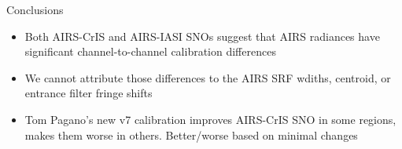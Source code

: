 \documentclass[10pt,t]{beamer}
\begin{document}
\begin{frame}[label={sec:orgee82d00}]{Conclusions}
\begin{itemize}
\item Both AIRS-CrIS and AIRS-IASI SNOs suggest that AIRS radiances have significant channel-to-channel calibration differences
\item We cannot attribute those differences to the AIRS SRF wdiths, centroid, or entrance filter fringe shifts
\item Tom Pagano's new v7 calibration improves AIRS-CrIS SNO in some regions, makes them worse in others.  Better/worse based on minimal changes
\end{itemize}
\end{frame}
\end{document}

